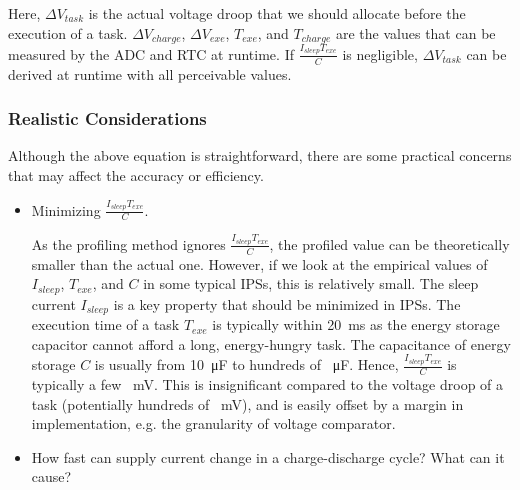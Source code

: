 Here, $\Delta V_{task}$ is the actual voltage droop that we should allocate before the execution of a task. 
$\Delta V_{charge}$, $\Delta V_{exe}$, $T_{exe}$, and $T_{charge}$ are the values that can be measured by the ADC and RTC at runtime. 
If $\frac{I_{sleep}T_{exe}}{C}$ is negligible, $\Delta V_{task}$ can be derived at runtime with all perceivable values. 

\subsubsection{Realistic Considerations}

Although the above equation is straightforward, there are some practical concerns that may affect the accuracy or efficiency. 

\begin{itemize}
    \item Minimizing $\frac{I_{sleep}T_{exe}}{C}$.

    As the profiling method ignores $\frac{I_{sleep}T_{exe}}{C}$, the profiled value can be theoretically smaller than the actual one. 
    However, if we look at the empirical values of $I_{sleep}$, $T_{exe}$, and $C$ in some typical IPSs, this is relatively small. 
    The sleep current $I_{sleep}$ is a key property that should be minimized in IPSs. 
    The execution time of a task $T_{exe}$ is typically within \SI{20}{\milli\second} as the energy storage capacitor cannot afford a long, energy-hungry task. 
    The capacitance of energy storage $C$ is usually from \SI{10}{\micro\farad} to hundreds of \SI{}{\micro\farad}. 
    Hence, $\frac{I_{sleep}T_{exe}}{C}$ is typically a few \SI{}{\milli\volt}. 
    This is insignificant compared to the voltage droop of a task (potentially hundreds of \SI{}{\milli\volt}), and is easily offset by a margin in implementation, e.g. the granularity of voltage comparator. 
    
    \item How fast can supply current change in a charge-discharge cycle? What can it cause?
    

\end{itemize}
